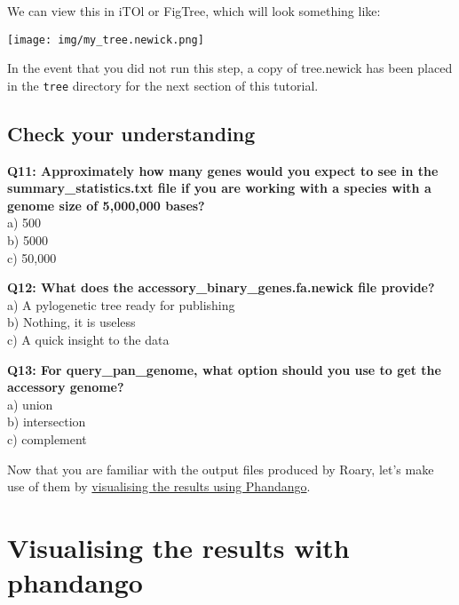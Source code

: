 \documentclass[11pt]{article}
\begin{document}
We can view this in iTOl or FigTree, which will look something like:


\begin{center}
\texttt{[image: img/my\_tree.newick.png]}
\end{center}


In the event that you did not run this step, a copy of tree.newick has
been placed in the \texttt{tree} directory for the next section of this
tutorial.

\hypertarget{check-your-understanding}{%
\subsection{Check your understanding}\label{check-your-understanding}}

\textbf{Q11: Approximately how many genes would you expect to see in the
summary\_statistics.txt file if you are working with a species with a
genome size of 5,000,000 bases?}\\
a) 500\\
b) 5000\\
c) 50,000

\textbf{Q12: What does the accessory\_binary\_genes.fa.newick file
provide?}\\
a) A pylogenetic tree ready for publishing\\
b) Nothing, it is useless\\
c) A quick insight to the data

\textbf{Q13: For query\_pan\_genome, what option should you use to get
the accessory genome?}\\
a) union\\
b) intersection\\
c) complement

Now that you are familiar with the output files produced by Roary, let's
make use of them by \href{phandango.ipynb}{visualising the results using
Phandango}.





\newpage





    \hypertarget{visualising-the-results-with-phandango}{%
\section{Visualising the results with
phandango}\label{visualising-the-results-with-phandango}}
\end{document}
